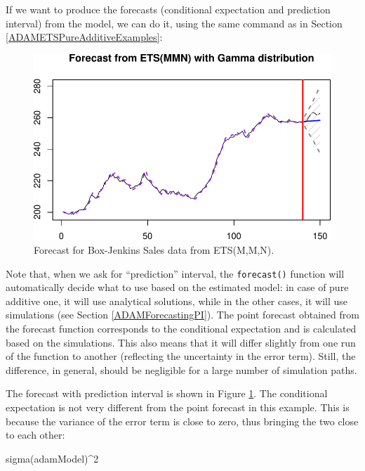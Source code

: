 \documentclass[
]{book}
\newenvironment{Shaded}{\begin{snugshade}}{\end{snugshade}}
\newcommand{\DecValTok}[1]{\textcolor[rgb]{0.00,0.00,0.81}{#1}}
\newcommand{\FunctionTok}[1]{\textcolor[rgb]{0.00,0.00,0.00}{#1}}
\newcommand{\NormalTok}[1]{#1}
\newcommand{\SpecialCharTok}[1]{\textcolor[rgb]{0.00,0.00,0.00}{#1}}
\theoremstyle{definition}
\theoremstyle{definition}
\theoremstyle{definition}
\theoremstyle{definition}
\theoremstyle{remark}
\begin{document}
If we want to produce the forecasts (conditional expectation and prediction interval) from the model, we can do it, using the same command as in Section \ref{ADAMETSPureAdditiveExamples}:

\begin{figure}
\centering
\includegraphics{Svetunkov--2022----ADAM_files/figure-latex/BJSalesadamETSMMNForecast-1.pdf}
\caption{\label{fig:BJSalesadamETSMMNForecast}Forecast for Box-Jenkins Sales data from ETS(M,M,N).}
\end{figure}

Note that, when we ask for ``prediction'' interval, the \texttt{forecast()} function will automatically decide what to use based on the estimated model: in case of pure additive one, it will use analytical solutions, while in the other cases, it will use simulations (see Section \ref{ADAMForecastingPI}). The point forecast obtained from the forecast function corresponds to the conditional expectation and is calculated based on the simulations. This also means that it will differ slightly from one run of the function to another (reflecting the uncertainty in the error term). Still, the difference, in general, should be negligible for a large number of simulation paths.

The forecast with prediction interval is shown in Figure \ref{fig:BJSalesadamETSMMNForecast}. The conditional expectation is not very different from the point forecast in this example. This is because the variance of the error term is close to zero, thus bringing the two close to each other:

\begin{Shaded}
\begin{Highlighting}[]
\FunctionTok{sigma}\NormalTok{(adamModel)}\SpecialCharTok{\^{}}\DecValTok{2}
\end{Highlighting}
\end{Shaded}
\end{document}
